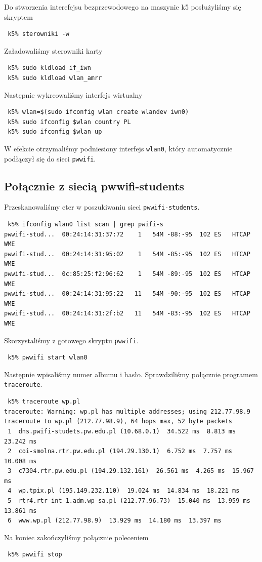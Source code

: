 \documentclass[a4paper,11pt,notitlepage]{article}
\begin{document}
Do stworzenia interefejsu bezprzewodowego na maszynie k5 posłużyliśmy się skryptem 
\begin{verbatim}
 k5% sterowniki -w
\end{verbatim}
Załadowaliśmy sterowniki karty 
\begin{verbatim}
 k5% sudo kldload if_iwn
 k5% sudo kldload wlan_amrr
\end{verbatim}
Następnie wykreowaliśmy interfejs wirtualny
\begin{verbatim}
 k5% wlan=$(sudo ifconfig wlan create wlandev iwn0)
 k5% sudo ifconfig $wlan country PL
 k5% sudo ifconfig $wlan up
\end{verbatim}
W efekcie otrzymaliśmy podniesiony interfejs \verb+wlan0+, który automatycznie podłączył się do sieci \verb+pwwifi+.

\subsection{Połącznie z siecią pwwifi-students}

Przeskanowaliśmy eter w poszukiwaniu sieci \verb+pwwifi-students+.
\begin{verbatim}
 k5% ifconfig wlan0 list scan | grep pwifi-s
pwwifi-stud...  00:24:14:31:37:72    1   54M -88:-95  102 ES   HTCAP WME
pwwifi-stud...  00:24:14:31:95:02    1   54M -85:-95  102 ES   HTCAP WME
pwwifi-stud...  0c:85:25:f2:96:62    1   54M -89:-95  102 ES   HTCAP WME
pwwifi-stud...  00:24:14:31:95:22   11   54M -90:-95  102 ES   HTCAP WME
pwwifi-stud...  00:24:14:31:2f:b2   11   54M -83:-95  102 ES   HTCAP WME
\end{verbatim}
Skorzystaliśmy z gotowego skryptu \verb+pwwifi+. 
\begin{verbatim}
 k5% pwwifi start wlan0
\end{verbatim}
Następnie wpisaliśmy numer albumu i hasło. Sprawdziliśmy połącznie programem \verb+traceroute+.
\begin{verbatim}
 k5% traceroute wp.pl
traceroute: Warning: wp.pl has multiple addresses; using 212.77.98.9
traceroute to wp.pl (212.77.98.9), 64 hops max, 52 byte packets
 1  dns.pwifi-studets.pw.edu.pl (10.68.0.1)  34.522 ms  8.813 ms  23.242 ms
 2  coi-smolna.rtr.pw.edu.pl (194.29.130.1)  6.752 ms  7.757 ms  10.008 ms
 3  c7304.rtr.pw.edu.pl (194.29.132.161)  26.561 ms  4.265 ms  15.967 ms
 4  wp.tpix.pl (195.149.232.110)  19.024 ms  14.834 ms  18.221 ms
 5  rtr4.rtr-int-1.adm.wp-sa.pl (212.77.96.73)  15.040 ms  13.959 ms  13.861 ms
 6  www.wp.pl (212.77.98.9)  13.929 ms  14.180 ms  13.397 ms
\end{verbatim}
Na koniec zakończyliśmy połącznie poleceniem
\begin{verbatim}
 k5% pwwifi stop
\end{verbatim}
\end{document}
